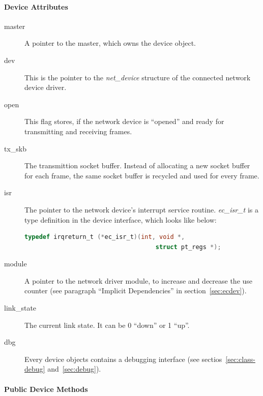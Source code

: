 \documentclass[a4paper,12pt,BCOR6mm,bibtotoc,idxtotoc]{scrbook}
\begin{document}
\paragraph{Device Attributes}

\begin{description}
\item[master] A pointer to the master, which owns the device object.
\item[dev] This is the pointer to the \textit{net\_device} structure
  of the connected network device driver.
\item[open] This flag stores, if the network device is ``opened'' and
  ready for transmitting and receiving frames.
\item[tx\_skb] The transmittion socket buffer. Instead of allocating a
  new socket buffer for each frame, the same socket buffer is recycled
  and used for every frame.
\item[isr] The pointer to the network device's interrupt service
  routine. \textit{ec\_isr\_t} is a type definition in the device
  interface, which looks like below:
  \begin{lstlisting}[gobble=4,language=C]
    typedef irqreturn_t (*ec_isr_t)(int, void *,
                                    struct pt_regs *);
  \end{lstlisting}
\item[module] A pointer to the network driver module, to increase and
  decrease the use counter (see paragraph ``Implicit Dependencies'' in
  section~\ref{sec:ecdev}).
\item[link\_state] The current link state. It can be 0 ``down'' or 1
  ``up''.
\item[dbg] Every device objects contains a debugging interface (see
  sectios~\ref{sec:class-debug} and~\ref{sec:debug}).
\end{description}

\paragraph{Public Device Methods}
\end{document}
